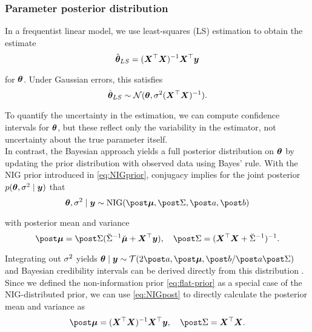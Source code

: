\subsubsection*{Parameter posterior distribution}

In a frequentist linear model, we use least-squares (LS) estimation to obtain the estimate
\begin{equation}\label{eq:LSE}
    \hat{\bm{\theta}}_{LS} = (\bm{X}^\top \bm{X})^{-1} \bm{X}^\top \bm{y}
\end{equation}

for $\bm{\theta}$.
Under Gaussian errors, this satisfies
\begin{equation*}
    \hat{\bm{\theta}}_{LS} \sim \mathcal{N}(\bm{\theta}, \sigma^2 (\bm{X}^\top \bm{X})^{-1}).
\end{equation*}

To quantify the uncertainty in the estimation, we can compute confidence intervals for $\bm{\theta}$, but these reflect only the variability in the estimator, not uncertainty about the true parameter itself.\\

In contrast, the Bayesian approach yields a full posterior distribution on $\bm{\theta}$ by updating the prior distribution with observed data using Bayes' rule.
With the NIG prior introduced in \eqref{eq:NIGprior}, conjugacy implies for the joint posterior $p(\bm{\theta}, \sigma^2 \mid \bm{y})$ that
\begin{equation*}
    \btheta, \ssd \mid \by \sim \text{NIG}(\mupo, \Sdpo, \apo, \bpo)
\end{equation*}

with posterior mean and variance \footnotemark
\begin{equation} \label{eq:NIGpost}
        \mupo = \Sdpo (\Sdipri \mupri + \bX^\top \by), \quad \Sdpo = (\bX^\top \bX + \Sdipri)^{-1}.
\end{equation}


Integrating out $\sigma^2$ yields $\btheta \mid \by \sim \Tcal(2 \apo, \mupo, \bpo / \apo \Sdpo)$ and Bayesian credibility intervals can be derived directly from this distribution \citep{held_likelihood_2020}.\\

Since we defined the non-information prior \eqref{eq:flat-prior} as a special case of the NIG-distributed prior, we can use \eqref{eq:NIGpost} to directly calculate the posterior mean and variance as
\begin{equation*}
        \mupo = (\bX^\top \bX)^{-1} \bX^\top \by, \quad
        \Sdpo = \bX^\top \bX.
\end{equation*}

